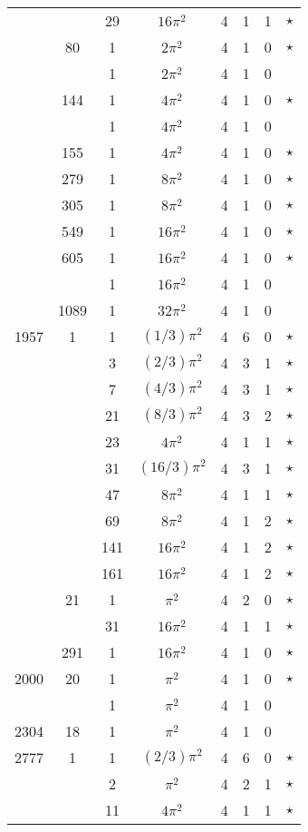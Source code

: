 \begin{tabular}{ccc|ccccc}
 &  & 29 & $16\pi^2$ & 4 & 1 & 1 & $\star$ \\
 & 80 & 1 & $2\pi^2$ & 4 & 1 & 0 & $\star$ \\
 &  & 1 & $2\pi^2$ & 4 & 1 & 0 &  \\
 & 144 & 1 & $4\pi^2$ & 4 & 1 & 0 & $\star$ \\
 &  & 1 & $4\pi^2$ & 4 & 1 & 0 &  \\
 & 155 & 1 & $4\pi^2$ & 4 & 1 & 0 & $\star$ \\
 & 279 & 1 & $8\pi^2$ & 4 & 1 & 0 & $\star$ \\
 & 305 & 1 & $8\pi^2$ & 4 & 1 & 0 & $\star$ \\
 & 549 & 1 & $16\pi^2$ & 4 & 1 & 0 & $\star$ \\
 & 605 & 1 & $16\pi^2$ & 4 & 1 & 0 & $\star$ \\
 &  & 1 & $16\pi^2$ & 4 & 1 & 0 &  \\
 & 1089 & 1 & $32\pi^2$ & 4 & 1 & 0 &  \\
1957 & 1 & 1 & $(1/3)\pi^2$ & 4 & 6 & 0 & $\star$ \\
 &  & 3 & $(2/3)\pi^2$ & 4 & 3 & 1 & $\star$ \\
 &  & 7 & $(4/3)\pi^2$ & 4 & 3 & 1 & $\star$ \\
 &  & 21 & $(8/3)\pi^2$ & 4 & 3 & 2 & $\star$ \\
 &  & 23 & $4\pi^2$ & 4 & 1 & 1 & $\star$ \\
 &  & 31 & $(16/3)\pi^2$ & 4 & 3 & 1 & $\star$ \\
 &  & 47 & $8\pi^2$ & 4 & 1 & 1 & $\star$ \\
 &  & 69 & $8\pi^2$ & 4 & 1 & 2 & $\star$ \\
 &  & 141 & $16\pi^2$ & 4 & 1 & 2 & $\star$ \\
 &  & 161 & $16\pi^2$ & 4 & 1 & 2 & $\star$ \\
 & 21 & 1 & $\pi^2$ & 4 & 2 & 0 & $\star$ \\
 &  & 31 & $16\pi^2$ & 4 & 1 & 1 & $\star$ \\
 & 291 & 1 & $16\pi^2$ & 4 & 1 & 0 & $\star$ \\
2000 & 20 & 1 & $\pi^2$ & 4 & 1 & 0 & $\star$ \\
 &  & 1 & $\pi^2$ & 4 & 1 & 0 &  \\
2304 & 18 & 1 & $\pi^2$ & 4 & 1 & 0 &  \\
2777 & 1 & 1 & $(2/3)\pi^2$ & 4 & 6 & 0 & $\star$ \\
 &  & 2 & $\pi^2$ & 4 & 2 & 1 & $\star$ \\
 &  & 11 & $4\pi^2$ & 4 & 1 & 1 & $\star$ \\

\end{tabular}
